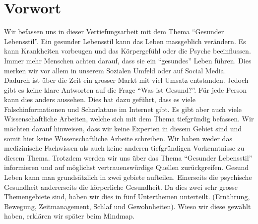 \chapter{Vorwort}
Wir befassen uns in dieser Vertiefungsarbeit mit dem Thema “Gesunder Lebensstil”.
\newline
Ein gesunder Lebensstil kann das Leben massgeblich verändern. Es kann Krankheiten vorbeugen und das Körpergefühl oder die Psyche beeinflussen.
\newline
Immer mehr Menschen achten darauf, dass sie ein “gesundes” Leben führen. Dies merken wir vor allem in unserem Sozialen Umfeld oder auf Social Media.
\newline
Dadurch ist über die Zeit ein grosser Markt mit viel Umsatz entstanden.
\newline
Jedoch gibt es keine klare Antworten auf die Frage “Was ist Gesund?”. Für jede Person kann dies anders aussehen. 
\newline
Dies hat dazu geführt, dass es viele Falschinformationen und Scharlatane im Internet gibt.
\newline
Es gibt aber auch viele Wissenschaftliche Arbeiten, welche sich mit dem Thema tiefgründig befassen.
\newline
Wir möchten darauf hinweisen, dass wir keine Experten in diesem Gebiet sind und somit hier keine Wissenschaftliche Arbeite schreiben. Wir haben weder das medizinische Fachwissen als auch keine anderen tiefgründigen Vorkenntnisse zu diesem Thema.
\newline
Trotzdem werden wir uns über das Thema “Gesunder Lebensstil” informieren und auf möglichst vertrauenswürdige Quellen zurückgreifen.
\newline
Gesund Leben kann man grundsätzlich in zwei gebiete aufteilen. Einerseits die psychische Gesundheit andererseits die körperliche Gesundheit. Da dies zwei sehr grosse Themengebiete sind, haben wir dies in fünf Unterthemen unterteilt.
\newline
(Ernährung, Bewegung, Zeitmanagement, Schlaf und Gewohnheiten). Wieso wir diese gewählt haben, erklären wir später beim Mindmap.

